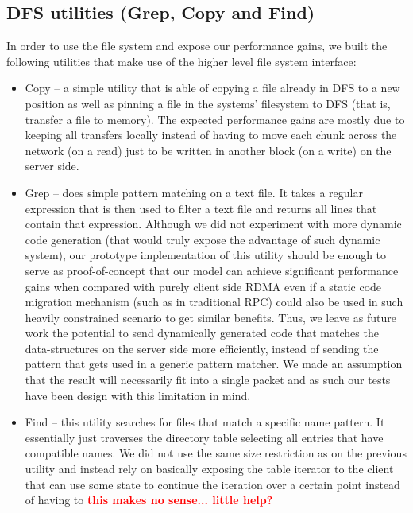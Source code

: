 \documentclass[10pt]{article}
\newcommand{\PROBLEM}[1] {\textbf{\textcolor{red}{#1}}}
\begin{document}
\subsection{DFS utilities (Grep, Copy and Find)}

In order to use the file system and expose our performance gains, we built the following utilities that make use of the higher level file system interface:

\begin{itemize}
\item Copy -- a simple utility that is able of copying a file already in DFS to a new position as well as pinning a file in the systems' filesystem to DFS (that is, transfer a file to memory). The expected performance gains are mostly due to keeping all transfers locally instead of having to move each chunk across the network (on a read) just to be written in another block (on a write) on the server side.

\item Grep -- does simple pattern matching on a text file. It takes a regular expression that is then used to filter a text file and returns all lines that contain that expression. Although we did not experiment with more dynamic code generation (that would truly expose the advantage of such dynamic system), our prototype implementation of this utility should be enough to serve as proof-of-concept that our model can achieve significant performance gains when compared with purely client side RDMA even if a static code migration mechanism (such as in traditional RPC) could also be used in such heavily constrained scenario to get similar benefits. Thus, we leave as future work the potential to send dynamically generated code that matches the data-structures on the server side more efficiently, instead of sending the pattern that gets used in a generic pattern matcher. 
We made an assumption that the result will necessarily fit into a single packet and as such our tests have been design with this limitation in mind.

\item Find -- this utility searches for files that match a specific name pattern. It essentially just traverses the directory table selecting all entries that have compatible names. We did not use the same size restriction as on the previous utility and instead rely on basically exposing the table iterator to the client that can use some state to continue the iteration over a certain point instead of having to \PROBLEM{this makes no sense... little help?}

\end{itemize}
\end{document}
